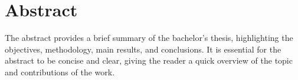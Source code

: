 \documentclass[12pt,a4paper]{report}
\begin{document}
\chapter*{Abstract}

The abstract provides a brief summary of the bachelor's thesis, highlighting the objectives, methodology, main results, and conclusions. It is essential for the abstract to be concise and clear, giving the reader a quick overview of the topic and contributions of the work.

% 

% 

% 

% 
\end{document}
